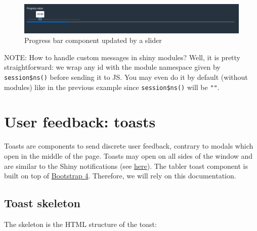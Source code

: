 \documentclass[
]{book}
\begin{document}
\begin{figure}
\includegraphics[width=14.4in]{images/practice/tabler-progress} \caption{Progress bar component updated by a slider}\label{fig:tabler-progress}
\end{figure}

NOTE: How to handle custom messages in shiny modules? Well, it is pretty straightforward: we wrap any id with the module namespace given by \texttt{session\$ns()} before sending it to JS. You may even do it by default (without modules) like in the previous example since \texttt{session\$ns()} will be \texttt{""}.

\hypertarget{user-feedback-toasts}{%
\section{User feedback: toasts}\label{user-feedback-toasts}}

Toasts are components to send discrete user feedback, contrary to modals which open in the middle of the page. Toasts may open on all sides of the window and are similar to the Shiny notifications (see \href{https://shiny.rstudio.com/reference/shiny/0.14/showNotification.html}{here}). The tabler toast component is built on top of \href{https://getbootstrap.com/docs/4.3/components/toasts/}{Bootstrap 4}. Therefore, we will rely on this documentation.

\hypertarget{toast-skeleton}{%
\subsection{Toast skeleton}\label{toast-skeleton}}

The skeleton is the HTML structure of the toast:
\end{document}

